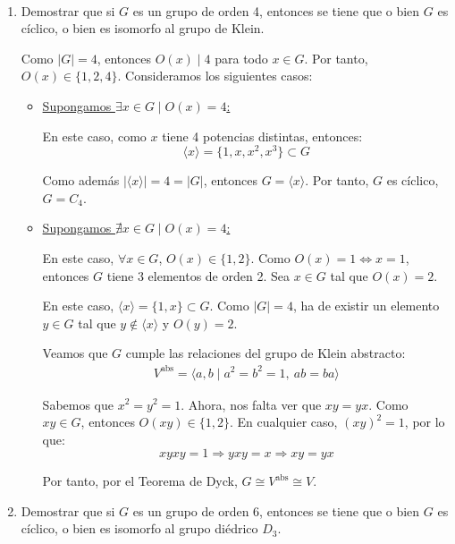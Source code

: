 \begin{ejercicio}\label{ej:3.10}~
    \begin{enumerate}
        \item Demostrar que si $G$ es un grupo de orden 4, entonces se tiene que o bien $G$ es cíclico, o bien es isomorfo al grupo de Klein.
        
        Como $|G|=4$, entonces $O(x)\mid 4$ para todo $x\in G$. Por tanto, $O(x)\in \{1,2,4\}$. Consideramos los siguientes casos:
        \begin{itemize}
            \item \ul{Supongamos $\exists x\in G\mid O(x)=4$:}
            
            En este caso, como $x$ tiene 4 potencias distintas, entonces:
            \begin{equation*}
                \langle x\rangle = \{1,x,x^2,x^3\}\subset G
            \end{equation*}

            Como además $|\langle x\rangle|=4=|G|$, entonces $G=\langle x\rangle$. Por tanto, $G$ es cíclico, $G=C_4$.

            \item \ul{Supongamos $\nexists x\in G\mid O(x)=4$:}
            
            En este caso, $\forall x\in G$, $O(x)\in\{1,2\}$. Como $O(x)=1\iff x=1$, entonces $G$ tiene $3$ elementos de orden 2. Sea $x\in G$ tal que $O(x)=2$.
            
            En este caso, $\langle x\rangle = \{1,x\}\subset G$. Como $|G|=4$, ha de existir un elemento $y\in G$ tal que $y\notin\langle x\rangle$ y $O(y)=2$.

            Veamos que $G$ cumple las relaciones del grupo de Klein abstracto:
            \begin{align*}
                V^{\text{abs}} = \langle a,b\mid a^2=b^2=1,\ ab=ba\rangle
            \end{align*}

            Sabemos que $x^2=y^2=1$. Ahora, nos falta ver que $xy=yx$. Como $xy\in G$, entonces $O(xy)\in\{1,2\}$. En cualquier caso, $(xy)^2=1$, por lo que:
            \begin{equation*}
                xyxy=1\Longrightarrow yxy=x\Longrightarrow xy=yx
            \end{equation*}

            Por tanto, por el Teorema de Dyck, $G\cong V^{\text{abs}}\cong V$.
        \end{itemize}
        \item Demostrar que si $G$ es un grupo de orden 6, entonces se tiene que o bien $G$ es cíclico, o bien es isomorfo al grupo diédrico $D_3$.
        

\end{enumerate}
\end{ejercicio}
